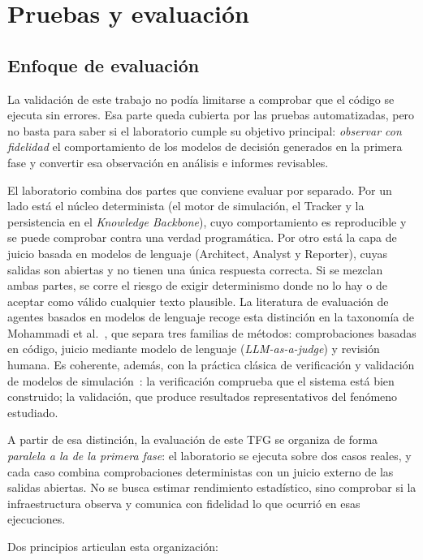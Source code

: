 \chapter{Pruebas y evaluación}

\section{Enfoque de evaluación}

La validación de este trabajo no podía limitarse a comprobar que el código se
ejecuta sin errores. Esa parte queda cubierta por las pruebas automatizadas,
pero no basta para saber si el laboratorio cumple su objetivo principal:
\emph{observar con fidelidad} el comportamiento de los modelos de decisión
generados en la primera fase y convertir esa observación en análisis e informes
revisables.

El laboratorio combina dos partes que conviene evaluar por separado. Por un
lado está el núcleo determinista (el motor de simulación, el
Tracker y la persistencia en el \textit{Knowledge Backbone}), cuyo
comportamiento es reproducible y se puede comprobar contra una verdad
programática. Por otro está la capa de juicio basada en modelos de
lenguaje (Architect, Analyst y Reporter), cuyas salidas son abiertas y no
tienen una única respuesta correcta. Si se mezclan ambas partes, se corre el
riesgo de exigir determinismo donde no lo hay o de aceptar como válido cualquier
texto plausible. La literatura de evaluación de agentes basados en modelos de
lenguaje recoge esta distinción en la taxonomía de Mohammadi et
al.~\cite{mohammadi2025agenteval}, que separa tres familias de métodos:
comprobaciones basadas en código, juicio
mediante modelo de lenguaje (\textit{LLM-as-a-judge}) y revisión humana. Es
coherente, además, con la práctica clásica de verificación y validación de
modelos de simulación~\cite{sargent2013vv}: la verificación comprueba que el
sistema está bien construido; la validación, que produce resultados
representativos del fenómeno estudiado.

A partir de esa distinción, la evaluación de este TFG se organiza de forma
\emph{paralela a la de la primera fase}: el laboratorio se ejecuta sobre dos
casos reales, y cada caso combina comprobaciones deterministas con un juicio
externo de las salidas abiertas. No se busca estimar rendimiento estadístico,
sino comprobar si la infraestructura observa y comunica con fidelidad lo que
ocurrió en esas ejecuciones.

Dos principios articulan esta organización:

